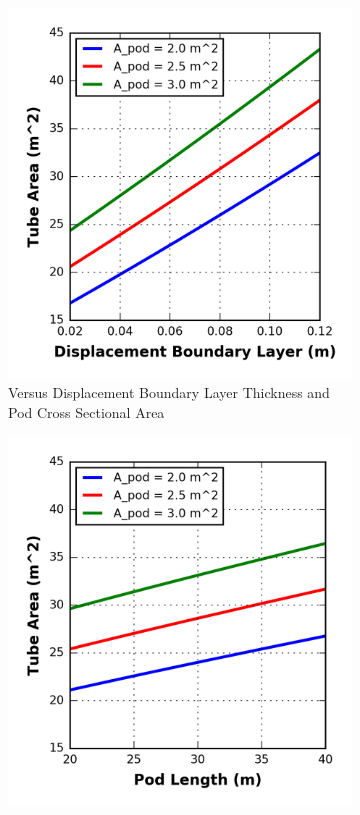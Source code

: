 \begin{figure}
\centering
\begin{subfigure}{.5\textwidth}
  \centering
  \includegraphics{../../images/graphs/boundary_layer_growth_trades/Tube_Area_vs_boundary_layer.png}
  \caption{Versus Displacement Boundary Layer Thickness and Pod Cross Sectional Area}
  \label{fig:cross_sec_area_vs_disp_boundary_layer}
\end{subfigure}%
\begin{subfigure}{.5\textwidth}
  \centering
  \includegraphics{../../images/graphs/boundary_layer_length_trades/Tube_Area_vs_pod_length.png}

\end{subfigure}
\end{figure}
